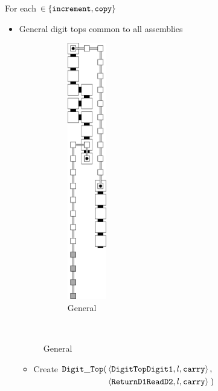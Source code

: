         For each {\inc} $\in \{ {\tt increment, copy } \}$
        \begin{itemize}
            \item General digit tops common to all assemblies

            \begin{figure}[H]
                \centering
                \begin{subfigure}[t]{0.2\textwidth}
                    \centering
                    \includegraphics[width=0.2\textwidth]{warping/digit_top_general}
                    \caption{\label{fig:warping/digit_top_general} General }
                \end{subfigure}%
                ~
            \end{figure}

            \begin{itemize}
                \item Create
                $\begin{aligned}[t]
                    {\tt Digit\_Top}(& \left \langle {\tt DigitTopDigit1}, l, {\tt carry} \right\rangle, & \\
                          & \left \langle {\tt ReturnD1ReadD2}, l,  {\tt carry} \right\rangle \;)
                \end{aligned}$
                \vspace{.5cm}


\end{itemize}
\end{itemize}
